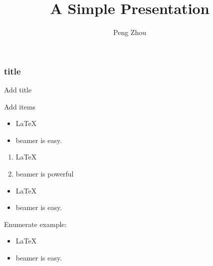 \documentclass{beamer}
\begin{document}
\title{A Simple Presentation}
\author{Peng Zhou}
\maketitle{}

\begin{frame}
  \frametitle{title}
Add title
\end{frame}

\begin{frame}
Add items
  \begin{itemize}
  \item \LaTeX{}
  \item beamer is easy.
  \end{itemize}

  \begin{enumerate}
  \item \LaTeX{}
  \item beamer is powerful
  \end{enumerate}
\end{frame}

\begin{frame}

  \begin{example}
    \begin{itemize}
    \item \LaTeX{}
    \item beamer is easy.
    \end{itemize}    
  \end{example}
\end{frame}


\begin{frame}
  \begin{exampleblock}{Enumerate example:}
    \begin{itemize}
    \item \LaTeX{}
    \item beamer is easy.
    \end{itemize}    
  \end{exampleblock}
\end{frame}
\end{document}
